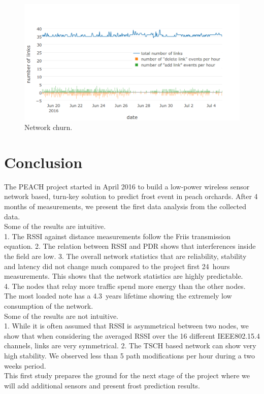 \documentclass{sig-alternate}
\begin{document}
\begin{figure}
    \centering
    \includegraphics[width=\columnwidth]{net_churn}
    \caption{Network churn.}
    \label{fig:net_churn}
\end{figure}

\section{Conclusion}
\label{sec:conclusion}

The PEACH project started in April 2016 to build a low-power wireless sensor network based, turn-key solution to predict frost event in peach orchards.
After 4 months of measurements, we present the first data analysis from the collected data.\\

Some of the results are intuitive.\\
1. The RSSI against distance measurements follow the Friis transmission equation.
2. The relation between RSSI and PDR shows that interferences inside the field are low.
3. The overall network statistics that are reliability, stability and latency did not change much compared to the project first 24~hours measurements.
This shows that the network statistics are highly predictable.\\
4. The nodes that relay more traffic spend more energy than the other nodes.
The most loaded note has a 4.3~years lifetime showing the extremely low consumption of the network.\\

Some of the results are not intuitive.\\
1. While it is often assumed that RSSI is asymmetrical between two nodes, we show that when considering the averaged RSSI over the 16 different IEEE802.15.4 channels, links are very symmetrical.
2. The TSCH based network can show very high stability.
We observed less than 5 path modifications per hour during a two weeks period.\\

This first study prepares the ground for the next stage of the project where we will add additional sensors and present frost prediction results.





\end{document}
